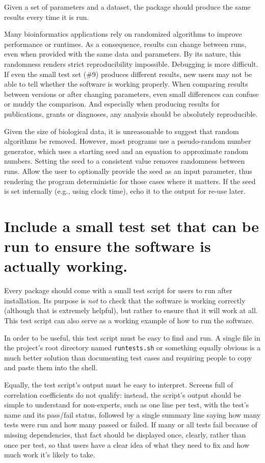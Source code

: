 \documentclass[10pt]{article}
\begin{document}
Given a set of parameters and a dataset, the package should produce the
same results every time it is run.

Many bioinformatics applications rely on randomized algorithms to
improve performance or runtimes. As a consequence, results can change
between runs, even when provided with the same data and parameters. By
its nature, this randomness renders strict reproducibility impossible.
Debugging is more difficult. If even the small test set (\#9) produces
different results, new users may not be able to tell whether the software is
working properly. When comparing
results between versions or after changing parameters, even small
differences can confuse or muddy the comparison. And especially when
producing results for publications, grants or diagnoses, any analysis
should be absolutely reproducible.

Given the size of biological data, it is unreasonable to suggest that
random algorithms be removed. However, most programs use a pseudo-random
number generator, which uses a starting seed and an equation to
approximate random numbers. Setting the seed to a consistent value
removes randomness between runs. Allow the user to optionally provide
the seed as an input parameter, thus rendering the program deterministic
for those cases where it matters. If the seed is set internally (e.g.,
using clock time), echo it to the output for re-use later.

\section{Include a small test set that can be run to ensure the software is actually working.}

Every package should come with a small test script for users to run
after installation. Its purpose is \emph{not} to check that the software
is working correctly (although that is extremely helpful), but rather to
ensure that it will work at all. This test script can also serve as a
working example of how to run the software.

In order to be useful, this test script must be easy to find and run. A
single file in the project's root directory named \texttt{runtests.sh}
or something equally obvious is a much better solution than documenting
test cases and requiring people to copy and paste them into the shell.

Equally, the test script's output must be easy to interpret. Screens
full of correlation coefficients do not qualify: instead, the script's
output should be simple to understand for non-experts, such as one line per test, with the test's name
and its pass/fail status, followed by a single summary line saying how
many tests were run and how many passed or failed. If many or all tests
fail because of missing dependencies, that fact should be displayed
once, clearly, rather than once per test, so that users have a clear
idea of what they need to fix and how much work it's likely to take.
\end{document}
